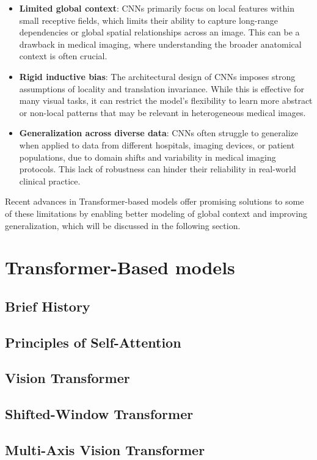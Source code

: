 \documentclass[a4paper,10pt]{book}
\begin{document}
\begin{itemize}
    \item \textbf{Limited global context}: CNNs primarily focus on local features within small receptive fields, which limits their ability to capture long-range dependencies or global spatial relationships across an image. This can be a drawback in medical imaging, where understanding the broader anatomical context is often crucial.
    
    \item \textbf{Rigid inductive bias}: The architectural design of CNNs imposes strong assumptions of locality and translation invariance. While this is effective for many visual tasks, it can restrict the model’s flexibility to learn more abstract or non-local patterns that may be relevant in heterogeneous medical images.
    
    \item \textbf{Generalization across diverse data}: CNNs often struggle to generalize when applied to data from different hospitals, imaging devices, or patient populations, due to domain shifts and variability in medical imaging protocols. This lack of robustness can hinder their reliability in real-world clinical practice.
\end{itemize}

Recent advances in Transformer-based models offer promising solutions to some of these limitations by enabling better modeling of global context and improving generalization, which will be discussed in the following section.

\section{Transformer-Based models}
\subsection{Brief History}
\subsection{Principles of Self-Attention}
\subsection{Vision Transformer}
\subsection{Shifted-Window Transformer}
\subsection{Multi-Axis Vision Transformer}
\end{document}
